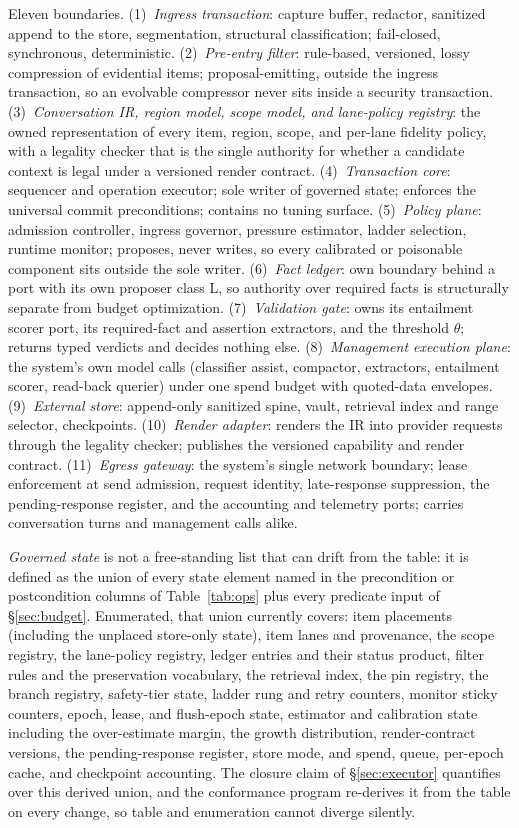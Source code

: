 \documentclass[11pt]{article}
\begin{document}
Eleven boundaries. (1)~\emph{Ingress transaction}: capture buffer, redactor, sanitized append to the store, segmentation, structural classification; fail-closed, synchronous, deterministic. (2)~\emph{Pre-entry filter}: rule-based, versioned, lossy compression of evidential items; proposal-emitting, outside the ingress transaction, so an evolvable compressor never sits inside a security transaction. (3)~\emph{Conversation IR, region model, scope model, and lane-policy registry}: the owned representation of every item, region, scope, and per-lane fidelity policy, with a legality checker that is the single authority for whether a candidate context is legal under a versioned render contract. (4)~\emph{Transaction core}: sequencer and operation executor; sole writer of governed state; enforces the universal commit preconditions; contains no tuning surface. (5)~\emph{Policy plane}: admission controller, ingress governor, pressure estimator, ladder selection, runtime monitor; proposes, never writes, so every calibrated or poisonable component sits outside the sole writer. (6)~\emph{Fact ledger}: own boundary behind a port with its own proposer class L, so authority over required facts is structurally separate from budget optimization. (7)~\emph{Validation gate}: owns its entailment scorer port, its required-fact and assertion extractors, and the threshold $\theta$; returns typed verdicts and decides nothing else. (8)~\emph{Management execution plane}: the system's own model calls (classifier assist, compactor, extractors, entailment scorer, read-back querier) under one spend budget with quoted-data envelopes. (9)~\emph{External store}: append-only sanitized spine, vault, retrieval index and range selector, checkpoints. (10)~\emph{Render adapter}: renders the IR into provider requests through the legality checker; publishes the versioned capability and render contract. (11)~\emph{Egress gateway}: the system's single network boundary; lease enforcement at send admission, request identity, late-response suppression, the pending-response register, and the accounting and telemetry ports; carries conversation turns and management calls alike.

\emph{Governed state} is not a free-standing list that can drift from the table: it is defined as the union of every state element named in the precondition or postcondition columns of Table~\ref{tab:ops} plus every predicate input of \S\ref{sec:budget}. Enumerated, that union currently covers: item placements (including the unplaced store-only state), item lanes and provenance, the scope registry, the lane-policy registry, ledger entries and their status product, filter rules and the preservation vocabulary, the retrieval index, the pin registry, the branch registry, safety-tier state, ladder rung and retry counters, monitor sticky counters, epoch, lease, and flush-epoch state, estimator and calibration state including the over-estimate margin, the growth distribution, render-contract versions, the pending-response register, store mode, and spend, queue, per-epoch cache, and checkpoint accounting. The closure claim of \S\ref{sec:executor} quantifies over this derived union, and the conformance program re-derives it from the table on every change, so table and enumeration cannot diverge silently.
\end{document}
